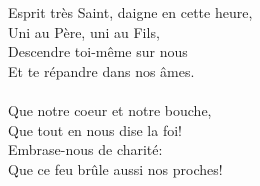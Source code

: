 Esprit très Saint, daigne en cette heure,\\
Uni au Père, uni au Fils,\\
Descendre toi-même sur nous\\
Et te répandre dans nos âmes.\\
\\
Que notre coeur et notre bouche,\\
Que tout en nous dise la foi!\\
Embrase-nous de charité:\\
Que ce feu brûle aussi nos proches!